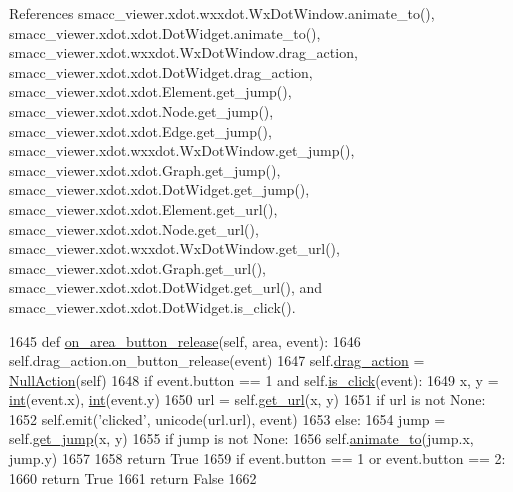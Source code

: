 References smacc\+\_\+viewer.\+xdot.\+wxxdot.\+Wx\+Dot\+Window.\+animate\+\_\+to(), smacc\+\_\+viewer.\+xdot.\+xdot.\+Dot\+Widget.\+animate\+\_\+to(), smacc\+\_\+viewer.\+xdot.\+wxxdot.\+Wx\+Dot\+Window.\+drag\+\_\+action, smacc\+\_\+viewer.\+xdot.\+xdot.\+Dot\+Widget.\+drag\+\_\+action, smacc\+\_\+viewer.\+xdot.\+xdot.\+Element.\+get\+\_\+jump(), smacc\+\_\+viewer.\+xdot.\+xdot.\+Node.\+get\+\_\+jump(), smacc\+\_\+viewer.\+xdot.\+xdot.\+Edge.\+get\+\_\+jump(), smacc\+\_\+viewer.\+xdot.\+wxxdot.\+Wx\+Dot\+Window.\+get\+\_\+jump(), smacc\+\_\+viewer.\+xdot.\+xdot.\+Graph.\+get\+\_\+jump(), smacc\+\_\+viewer.\+xdot.\+xdot.\+Dot\+Widget.\+get\+\_\+jump(), smacc\+\_\+viewer.\+xdot.\+xdot.\+Element.\+get\+\_\+url(), smacc\+\_\+viewer.\+xdot.\+xdot.\+Node.\+get\+\_\+url(), smacc\+\_\+viewer.\+xdot.\+wxxdot.\+Wx\+Dot\+Window.\+get\+\_\+url(), smacc\+\_\+viewer.\+xdot.\+xdot.\+Graph.\+get\+\_\+url(), smacc\+\_\+viewer.\+xdot.\+xdot.\+Dot\+Widget.\+get\+\_\+url(), and smacc\+\_\+viewer.\+xdot.\+xdot.\+Dot\+Widget.\+is\+\_\+click().


\begin{DoxyCode}
1645     \textcolor{keyword}{def }\hyperlink{classsmacc__viewer_1_1xdot_1_1xdot_1_1DotWidget_a0d3a221636156c6cddf5c8890ef23f65}{on\_area\_button\_release}(self, area, event):
1646         self.drag\_action.on\_button\_release(event)
1647         self.\hyperlink{classsmacc__viewer_1_1xdot_1_1xdot_1_1DotWidget_a767a18a13a9581e3e7afd20bf0842856}{drag\_action} = \hyperlink{classsmacc__viewer_1_1xdot_1_1xdot_1_1NullAction}{NullAction}(self)
1648         \textcolor{keywordflow}{if} event.button == 1 \textcolor{keywordflow}{and} self.\hyperlink{classsmacc__viewer_1_1xdot_1_1xdot_1_1DotWidget_aeb999fe6900e9e916cf5eacb5d2e0108}{is\_click}(event):
1649             x, y = \hyperlink{classint}{int}(event.x), \hyperlink{classint}{int}(event.y)
1650             url = self.\hyperlink{classsmacc__viewer_1_1xdot_1_1xdot_1_1DotWidget_a49b181baa333bf1f6112a0c4766eef87}{get\_url}(x, y)
1651             \textcolor{keywordflow}{if} url \textcolor{keywordflow}{is} \textcolor{keywordflow}{not} \textcolor{keywordtype}{None}:
1652                 self.emit(\textcolor{stringliteral}{'clicked'}, unicode(url.url), event)
1653             \textcolor{keywordflow}{else}:
1654                 jump = self.\hyperlink{classsmacc__viewer_1_1xdot_1_1xdot_1_1DotWidget_ab1887c93ca72f4aa9bef7d345efb740a}{get\_jump}(x, y)
1655                 \textcolor{keywordflow}{if} jump \textcolor{keywordflow}{is} \textcolor{keywordflow}{not} \textcolor{keywordtype}{None}:
1656                     self.\hyperlink{classsmacc__viewer_1_1xdot_1_1xdot_1_1DotWidget_a33af11b3c0562e84fa1c6b32d459f57e}{animate\_to}(jump.x, jump.y)
1657 
1658             \textcolor{keywordflow}{return} \textcolor{keyword}{True}
1659         \textcolor{keywordflow}{if} event.button == 1 \textcolor{keywordflow}{or} event.button == 2:
1660             \textcolor{keywordflow}{return} \textcolor{keyword}{True}
1661         \textcolor{keywordflow}{return} \textcolor{keyword}{False}
1662 
\end{DoxyCode}



